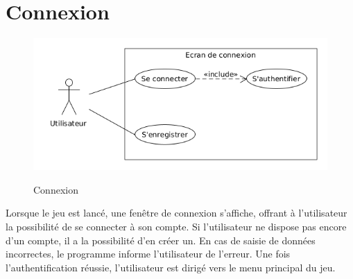 \documentclass[../besoin_user.tex]{subfiles}
\begin{document}
\section{Connexion}
\begin{figure}[h]
    \centering
    \includegraphics[scale=0.6]{img_fonctionnel/use_case_user_connexion.png}
    \label{fig:user_connexion}
    \caption{Connexion}
\end{figure}
  Lorsque le jeu est lancé, une fenêtre de connexion s'affiche, offrant à l'utilisateur la possibilité de se connecter à son compte. 
  Si l'utilisateur ne dispose pas encore d'un compte, il a la possibilité d'en créer un. 
  En cas de saisie de données incorrectes, le programme informe l'utilisateur de l'erreur. 
  Une fois l'authentification réussie, l'utilisateur est dirigé vers le menu principal du jeu.
  \newpage
\end{document}
